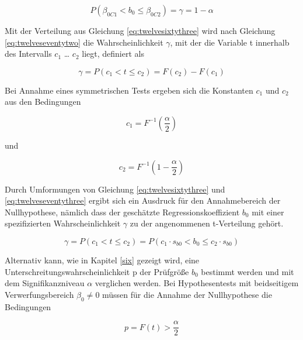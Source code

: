 \begin{equation}\label{eq:twelveseventytwo}
P\left(\beta _{0C1} <b_{0} \le \beta _{0C2} \right)=\gamma =1-\alpha
\end{equation}

\noindent Mit der Verteilung aus Gleichung \eqref{eq:twelvesixtythree} wird nach Gleichung \eqref{eq:twelveseventytwo} die Wahrscheinlichkeit $\gamma$, mit der die Variable t innerhalb des Intervalls $c_{1}$ {\dots} $c_{2}$ liegt, definiert als

\begin{equation}\label{eq:twelveseventythree}
\gamma =P(c_{1} <t\le c_{2})=F(c_{2})-F(c_{1})
\end{equation}

\noindent Bei Annahme eines symmetrischen Tests ergeben sich die Konstanten $c_{1}$ und $c_{2}$ aus den Bedingungen

\begin{equation}\label{eq:twelveseventyfour}
c_{1} =F^{-1} \left(\dfrac{\alpha }{2} \right)
\end{equation}

\noindent und

\begin{equation}\label{eq:twelveseventyfive}
c_{2} =F^{-1} \left(1-\dfrac{\alpha }{2} \right)
\end{equation}

\noindent Durch Umformungen von Gleichung \eqref{eq:twelvesixtythree} und \eqref{eq:twelveseventythree} ergibt sich ein Ausdruck f\"{u}r den Annahmebereich der Nullhypothese, n\"{a}mlich dass der gesch\"{a}tzte Regressionskoeffizient $b_{0}$ mit einer spezifizierten Wahrscheinlichkeit $\gamma$ zu der angenommenen t-Verteilung geh\"{o}rt.

\begin{equation}\label{eq:twelveseventysix}
\gamma =P(c_{1} <t\le c_{2})=P(c_{1} \cdot s_{b0} <b_{0} \le c_{2} \cdot s_{b0})
\end{equation}

\noindent Alternativ kann, wie in Kapitel \ref{six} gezeigt wird, eine Unterschreitungswahrscheinlichkeit p der Pr\"{u}fgr\"{o}{\ss}e $b_{0}$ bestimmt werden und mit dem Signifikanzniveau $\alpha$ verglichen werden. Bei Hypothesentests mit beidseitigem Verwerfungsbereich $\beta_{0} \neq 0$  m\"{u}ssen f\"{u}r die Annahme der Nullhypothese die Bedingungen

\begin{equation}\label{eq:twelveseventyseven}
p=F(t)>\dfrac{\alpha }{2}
\end{equation}

